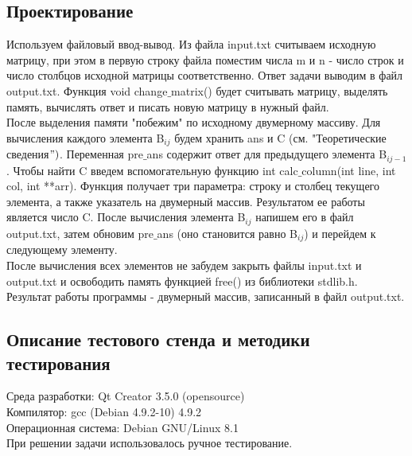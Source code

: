 \documentclass[12pt,a4paper]{report}
\begin{document}
\subsection{Проектирование}
Используем файловый ввод-вывод. Из файла input.txt считываем исходную матрицу, при этом в первую строку файла поместим числа m и n - число строк и число столбцов исходной матрицы соответственно. Ответ задачи выводим в файл output.txt. Функция void change$\_$matrix() будет считывать матрицу, выделять память, вычислять ответ и писать новую матрицу в нужный файл. \\
После выделения памяти "побежим" по исходному двумерному массиву. Для вычисления каждого элемента B$_{i j}$ будем хранить ans и C (см. "Теоретические сведения$")$. Переменная pre$\_$ans содержит ответ для предыдущего элемента B$_{i j-1}$. Чтобы найти C введем вспомогательную функцию int calc$\_$column(int line, int col, int **arr). Функция получает три параметра: строку и столбец текущего элемента, а также указатель на двумерный массив. Результатом ее работы является число C. После вычисления элемента B$_{i j}$ напишем его в файл output.txt, затем обновим pre$\_$ans (оно становится равно B$_{i j}$) и перейдем к следующему элементу. \\
После вычисления всех элементов не забудем закрыть файлы input.txt и output.txt и освободить память функцией free() из библиотеки stdlib.h. \\
Результат работы программы - двумерный массив, записанный в файл output.txt. 
\subsection{Описание тестового стенда и методики тестирования}
Среда разработки: Qt Creator 3.5.0 (opensource)\\
Компилятор: gcc (Debian 4.9.2-10) 4.9.2 \\
Операционная система: Debian GNU/Linux 8.1 \\
При решении задачи использовалось ручное тестирование. 
\end{document}

